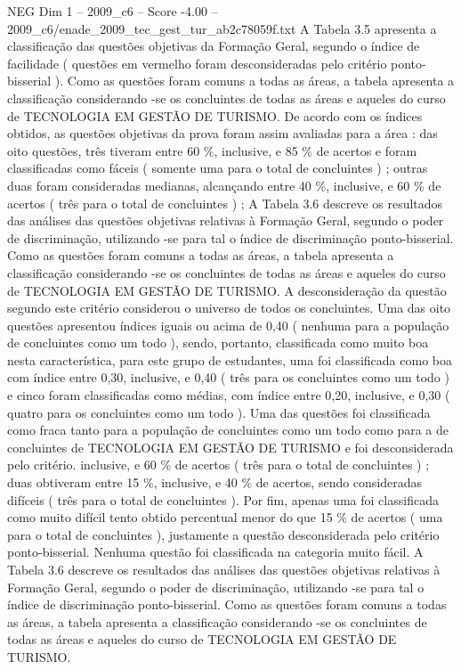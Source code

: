 \begin{textsample}{NEG Dim 1 – 2009\_c6 – Score -4.00 – 2009\_c6/enade\_2009\_tec\_gest\_tur\_ab2c78059f.txt}
A Tabela 3.5 apresenta a classificação das questões objetivas da Formação Geral, segundo o índice de facilidade ( questões em vermelho foram desconsideradas pelo critério ponto-bisserial ).
Como as questões foram comuns a todas as áreas, a tabela apresenta a classificação considerando -se os concluintes de todas as áreas e aqueles do curso de TECNOLOGIA EM GESTÃO DE TURISMO.
De acordo com os índices obtidos, as questões objetivas da prova foram assim avaliadas para a área : das oito questões, três tiveram entre 60 \%, inclusive, e 85 \% de acertos e foram classificadas como fáceis ( somente uma para o total de concluintes ) ; outras duas foram consideradas medianas, alcançando entre 40 \%, inclusive, e 60 \% de acertos ( três para o total de concluintes ) ; A Tabela 3.6 descreve os resultados das análises das questões objetivas relativas à Formação Geral, segundo o poder de discriminação, utilizando -se para tal o índice de discriminação ponto-bisserial.
Como as questões foram comuns a todas as áreas, a tabela apresenta a classificação considerando -se os concluintes de todas as áreas e aqueles do curso de TECNOLOGIA EM GESTÃO DE TURISMO.
A desconsideração da questão segundo este critério considerou o universo de todos os concluintes.
Uma das oito questões apresentou índices iguais ou acima de 0,40 ( nenhuma para a população de concluintes como um todo ), sendo, portanto, classificada como muito boa nesta característica, para este grupo de estudantes, uma foi classificada como boa com índice entre 0,30, inclusive, e 0,40 ( três para os concluintes como um todo ) e cinco foram classificadas como médias, com índice entre 0,20, inclusive, e 0,30 ( quatro para os concluintes como um todo ).
Uma das questões foi classificada como fraca tanto para a população de concluintes como um todo como para a de concluintes de TECNOLOGIA EM GESTÃO DE TURISMO e foi desconsiderada pelo critério. inclusive, e 60 \% de acertos ( três para o total de concluintes ) ; duas obtiveram entre 15 \%, inclusive, e 40 \% de acertos, sendo consideradas difíceis ( três para o total de concluintes ).
Por fim, apenas uma foi classificada como muito difícil tento obtido percentual menor do que 15 \% de acertos ( uma para o total de concluintes ), justamente a questão desconsiderada pelo critério ponto-bisserial.
Nenhuma questão foi classificada na categoria muito fácil.
A Tabela 3.6 descreve os resultados das análises das questões objetivas relativas à Formação Geral, segundo o poder de discriminação, utilizando -se para tal o índice de discriminação ponto-bisserial.
Como as questões foram comuns a todas as áreas, a tabela apresenta a classificação considerando -se os concluintes de todas as áreas e aqueles do curso de TECNOLOGIA EM GESTÃO DE TURISMO.

\end{textsample}
